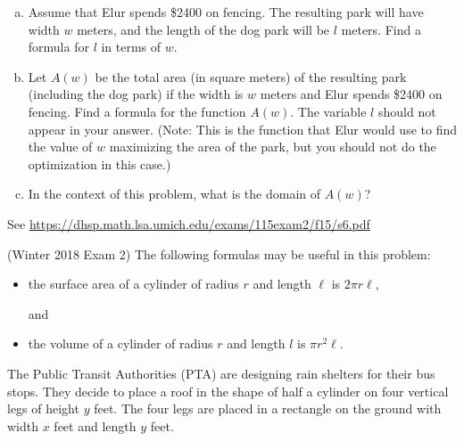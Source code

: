 \documentclass[11pt]{exam}
\begin{document}
\begin{questions}
\begin{enumerate}[(a)]
\item Assume that Elur spends \$2400 on fencing. The resulting park will have width $w$ meters, and the length of the dog park will be $l$ meters. Find a formula for $l$ in terms of $w$.
\item Let $A(w)$ be the total area (in square meters) of the resulting park (including the dog park) if the width is $w$ meters and Elur spends \$2400 on fencing. Find a formula for the function $A(w)$. The variable $l$ should not appear in your answer.
(Note: This is the function that Elur would use to find the value of $w$ maximizing the area of the park, but you should not do the optimization in this case.)
\item In the context of this problem, what is the domain of $A(w)$?
\end{enumerate}
\begin{solution}
  See \href{https://dhsp.math.lsa.umich.edu/exams/115exam2/f15/s6.pdf}{https://dhsp.math.lsa.umich.edu/exams/115exam2/f15/s6.pdf}
\end{solution}
\vspace{0.75in}
\question (Winter 2018 Exam 2) %
The following formulas may be useful in this problem:
\begin{itemize}
\item the surface area of a cylinder of radius $r$ and length $\ell$ is $2 \pi r \ell$, 

and
\item the volume of a cylinder of radius $r$ and length $l$ is $\pi r^2 \ell$.
\end{itemize}

\begin{minipage}{0.6\textwidth}
The Public Transit Authorities (PTA) are designing rain shelters for their bus stops. They decide to place a roof in the shape of half a cylinder on four vertical legs of height $y$ feet. The four legs are placed in a rectangle on the ground with width $x$ feet and length $y$ feet.


\end{minipage}
\end{questions}
\end{document}
